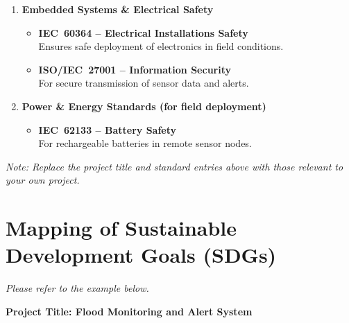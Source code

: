 \documentclass[a4paper, 11pt, oneside]{Thesis-1}
\begin{document}
\begin{enumerate}
  \item \textbf{Embedded Systems \& Electrical Safety}
  \begin{itemize}
    \item \textbf{IEC~60364 -- Electrical Installations Safety}\\
          Ensures safe deployment of electronics in field conditions.
    \item \textbf{ISO/IEC~27001 -- Information Security}\\
          For secure transmission of sensor data and alerts.
  \end{itemize}

  \item \textbf{Power \& Energy Standards (for field deployment)}
  \begin{itemize}
    \item \textbf{IEC~62133 -- Battery Safety}\\
          For rechargeable batteries in remote sensor nodes.
  \end{itemize}

\end{enumerate}

\noindent\textit{Note: Replace the project title and standard entries above with those
relevant to your own project.}

\clearpage

{}
\chapter*{Mapping of Sustainable Development Goals (SDGs)}

\noindent\textit{Please refer to the example below.}

\medskip
\noindent\textbf{Project Title: Flood Monitoring and Alert System}

\end{document}
